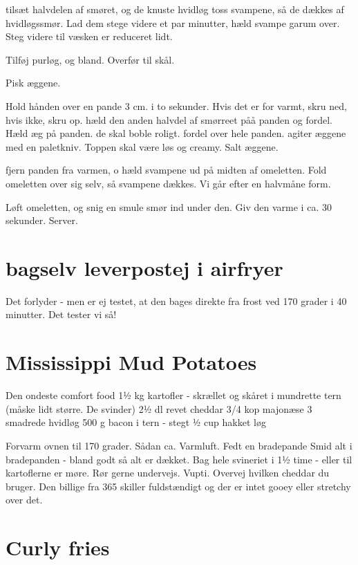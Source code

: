 \documentclass[
]{book}
\begin{document}
tilsæt halvdelen af smøret, og de knuste hvidløg
toss svampene, så de dækkes af hvidløgssmør.
Lad dem stege videre et par minutter, hæld svampe garum over. Steg videre til væsken er reduceret lidt.

Tilføj purløg, og bland. Overfør til skål.

Pisk æggene.

Hold hånden over en pande 3 cm. i to sekunder. Hvis det er for varmt, skru ned, hvis ikke, skru op.
hæld den anden halvdel af smørreet påå panden og fordel.
Hæld æg på panden. de skal boble roligt. fordel over hele panden. agiter æggene med en paletkniv.
Toppen skal være løs og creamy. Salt æggene.

fjern panden fra varmen, o hæld svampene ud på midten af omeletten.
Fold omeletten over sig selv, så svampene dækkes. Vi går efter en halvmåne form.

Løft omeletten, og snig en smule smør ind under den. Giv den varme i ca. 30 sekunder. Server.

\section{bagselv leverpostej i airfryer}\label{bagselv-leverpostej-i-airfryer}

Det forlyder - men er ej testet, at den bages direkte fra
frost ved 170 grader i 40 minutter.
Det tester vi så!

\section{Mississippi Mud Potatoes}\label{mississippi-mud-potatoes}

Den ondeste comfort food
1½ kg kartofler - skrællet og skåret i mundrette tern (måske lidt større. De svinder)
2½ dl revet cheddar
3/4 kop majonæse
3 smadrede hvidløg
500 g bacon i tern - stegt
½ cup hakket løg

Forvarm ovnen til 170 grader. Sådan ca. Varmluft.
Fedt en bradepande
Smid alt i bradepanden - bland godt så alt er dækket.
Bag hele svineriet i 1½ time - eller til kartoflerne er møre.
Rør gerne undervejs.
Vupti. Overvej hvilken cheddar du bruger. Den billige fra 365 skiller
fuldstændigt og der er intet gooey eller stretchy over det.

\section{Curly fries}\label{curly-fries}
\end{document}
